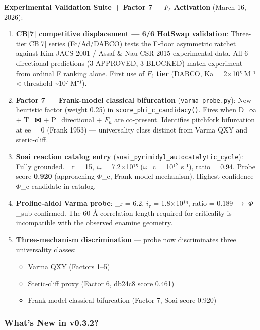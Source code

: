 \documentclass[12pt,a4paper]{article}
\begin{document}
\textbf{Experimental Validation Suite + Factor 7 + $F_{\ell}$ Activation} (March 16, 2026):

\begin{enumerate}
    \item \textbf{CB{[}7{]} competitive displacement --- 6/6 HotSwap validation}: Three-tier CB{[}7{]} series (Fc/Ad/DABCO) tests the F-floor asymmetric ratchet against Kim JACS 2001 / Assaf \& Nau CSR 2015 experimental data. All 6 directional predictions (3 APPROVED, 3 BLOCKED) match experiment from ordinal F ranking alone. First use of \textbf{$F_{\ell}$ tier} (DABCO, Ka = 2$\times$10⁵ M⁻¹ \textless{} threshold \textasciitilde{}10⁷ M⁻¹).
    \item \textbf{Factor 7 --- Frank-model classical bifurcation} (\texttt{varma\_probe.py}): New heuristic factor (weight 0.25) in \texttt{score\_phi\_c\_candidacy()}. Fires when D\_$\infty$ + T\_⋈ + P\_directional + $F_{\hbar}$ are co-present. Identifies pitchfork bifurcation at ee = 0 (Frank 1953) --- universality class distinct from Varma QXY and steric-cliff.
    \item \textbf{Soai reaction catalog entry} (\texttt{soai\_pyrimidyl\_autocatalytic\_cycle}): Fully grounded. \xi\_r = 15, \x$i_{\tau}$ = 7.2$\times$10¹⁵ ($\omega$\_c = 10¹$^{2}$ s⁻¹), ratio = 0.94. Probe score \textbf{0.920} (approaching $\Phi$\_c, Frank-model mechanism). Highest-confidence $\Phi$\_c candidate in catalog.
    \item \textbf{Proline-aldol Varma probe}: \xi\_r = 6.2, \x$i_{\tau}$ = 1.8$\times$10¹⁴, ratio = 0.189 $\rightarrow$ $\Phi$\_sub confirmed. The 60 Å correlation length required for criticality is incompatible with the observed enamine geometry.
    \item 
    \textbf{Three-mechanism discrimination} --- probe now discriminates three universality classes:

    \begin{itemize}
    \item Varma QXY (Factors 1--5)
    \item Steric-cliff proxy (Factor 6, db24c8 score 0.461)
    \item Frank-model classical bifurcation (Factor 7, Soai score 0.920)
\end{itemize}

\end{enumerate}

\subsubsection{What's New in v0.3.2?}
\end{document}
